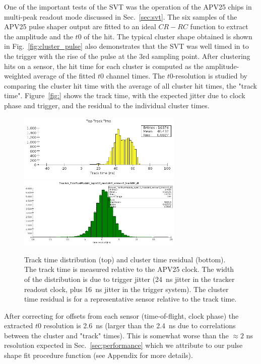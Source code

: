 One of the important tests of the SVT was the operation of the APV25 chips in multi-peak readout mode 
discussed in Sec.~\ref{sec:svt}. The six samples of the APV25 pulse shaper output 
are fitted to an ideal $CR-RC$ function to extract the amplitude and the $t0$ of the hit. 
The typical cluster shape obtained is shown in Fig.~\ref{fig:cluster_pulse} also demonstrates that the SVT was well timed in to the trigger with the rise of the pulse at the 3rd sampling point.
After clustering hits on a sensor, the hit time for each cluster is computed as the amplitude-weighted average of 
the fitted $t0$ channel times. The $t0$-resolution is studied by comparing the cluster hit time with the average of all cluster hit times, the "track time". Figure~\ref{fig:} shows the track time, with the expected jitter due to clock phase and trigger, and the residual to the individual cluster times. 
\begin{figure}[h]
	\includegraphics[width=0.7\textwidth]{test2012/svtperformance/track_time_top}
	\includegraphics[width=0.7\textwidth]{test2012/svtperformance/timeres}
	\caption{\small{Track time distribution (top) and cluster time residual (bottom). The 
	track time is measured relative to the APV25 clock. The width of the distribution is due to 
	trigger jitter (24~ns jitter in the tracker readout clock, plus 16~ns jitter in the trigger system). 
	The cluster time residual is for a representative sensor relative to the track time.}}
	\label{fig:tracktime}
\end{figure}
After correcting for offsets from each sensor (time-of-flight, clock phase) the extracted $t0$ resolution is 2.6~ns (larger than the 2.4~ns due to correlations between the cluster and "track" times). This is somewhat worse than the $\approx 2$ ns resolution expected in Sec.~\ref{sec:performance} which we attribute to our pulse shape fit procedure function (see Appendix for more details). 

